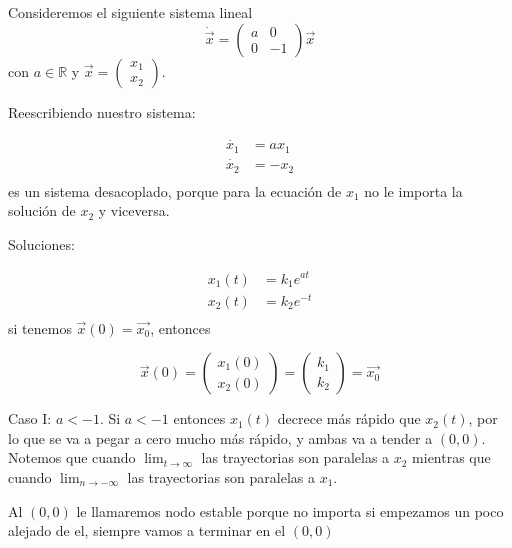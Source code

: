 \begin{ejemplo} Consideremos el siguiente sistema lineal $$
  \dot{\vec{x}} = \begin{pmatrix} a & 0 \\ 0 & -1 \end{pmatrix} \vec{x}
$$
con $a \in \mathbb{R}$ y $\vec{x}=\begin{pmatrix} x_1 \\ x_2 \end{pmatrix} $.

Reescribiendo nuestro sistema:

$$
\begin{aligned}
  \dot{x_1} &= ax_1 \\ 
  \dot{x_2} &= -x_2 \\ 
\end{aligned}
$$
es un sistema desacoplado, porque para la ecuación de $x_1$ no le importa la solución de $x_2$ y viceversa.

Soluciones:

$$
\begin{aligned}
  x_1(t) &= k_1e^{at} \\
  x_2(t) &= k_2e^{-t} \\ 
\end{aligned}
$$
  si tenemos $\vec{x}(0)=\vec{x_0}$, entonces

  $$
  \vec{x}(0)=\begin{pmatrix} x_1(0) \\ x_2(0) \end{pmatrix} = \begin{pmatrix} k_1 \\ k_2 \end{pmatrix} = \vec{x_0}
  $$

  Caso I: $a<-1$. Si $a<-1$ entonces  $x_1(t)$ decrece más rápido que $x_2(t)$, por lo que se va a pegar a cero mucho más rápido, y ambas va a tender a $(0,0)$. Notemos que cuando $\lim_{t \to \infty} $ las trayectorias son paralelas a $x_2$ mientras que cuando $\lim_{n \to -\infty} $ las trayectorias son paralelas a $x_1$.

  \begin{tcolorbox}[colback=Black!4,colframe=White] 
  \begin{nota}
    Al $(0,0)$ le llamaremos nodo estable porque no importa si empezamos un poco alejado de el, siempre vamos a terminar en el  $(0,0)$
  \end{nota}
\end{tcolorbox}


\end{ejemplo}
